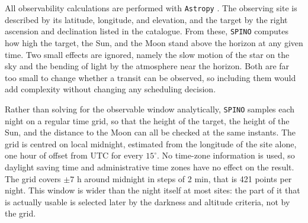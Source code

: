 


All observability calculations are performed with \texttt{Astropy} \citep{astropy2022}. The observing site is described by its latitude, longitude, and elevation, and the target by the right ascension and declination listed in the catalogue. From these, \texttt{SPINO} computes how high the target, the Sun, and the Moon stand above the horizon at any given time. Two small effects are ignored, namely the slow motion of the star on the sky and the bending of light by the atmosphere near the horizon. Both are far too small to change whether a transit can be observed, so including them would add complexity without changing any scheduling decision.

Rather than solving for the observable window analytically, \texttt{SPINO} samples each night on a regular time grid, so that the height of the target, the height of the Sun, and the distance to the Moon can all be checked at the same instants. The grid is centred on local midnight, estimated from the longitude of the site alone, one hour of offset from UTC for every $15^\circ$. No time-zone information is used, so daylight saving time and administrative time zones have no effect on the result. The grid covers $\pm 7$ h around midnight in steps of 2 min, that is 421 points per night. This window is wider than the night itself at most sites: the part of it that is actually usable is selected later by the darkness and altitude criteria, not by the grid.




